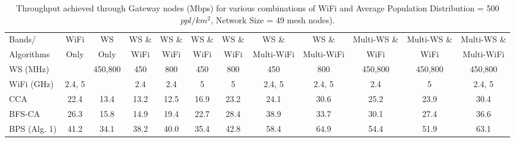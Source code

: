 \begin{table}
\centering %
\begin{tabular}{|l|c|c|c|c|c|c|c|c|c|c|c|} %
\hline %
Bands/     & WiFi    & WS      & WS \& & WS \& &  WS \& & WS \& & WS \&      &  WS \&      & Multi-WS \& & Multi-WS \& & Multi-WS \& \\%
Algorithms & Only    & Only    & WiFi  & WiFi  &  WiFi  & WiFi  & Multi-WiFi &  Multi-WiFi & WiFi        & WiFi        & Multi-WiFi  \\
\hline %
WS (MHz)   &                                                        & 450,800 & 450 &  800  &  450   & 800               & 450    & 800      & 450,800     & 450,800     & 450,800     \\
\hline
WiFi (GHz) & 2.4, 5 &                                                             & 2.4 &  2.4  &  5   & 5               & 2.4, 5& 2.4, 5        & 2.4             & 5         & 2.4, 5     \\ %
\hline
\hline %
CCA~\cite{draves2004routing}                & 22.4   &  13.4  & 13.2    &12.5    & 16.9       & 23.2   &  24.1  &   30.6&  25.2  &       23.9       &   30.4          \\      
\hline %
BFS-CA~\cite{ramachandran2006interference}  & 26.3   &  15.8  & 14.9    & 19.4   & 22.7       & 28.4   &  38.9  &   33.7&  30.1  &       27.4       &       36.6      \\      
\hline %
BPS (Alg. 1)                                & 41.2   & 34.1   &  38.2  & 40.0    & 35.4       & 42.8   & 58.4   &  64.9 &  54.4  &       51.9       &       63.1      \\      
\hline %
\end{tabular}    
\caption{Throughput achieved through Gateway nodes (Mbps) for various combinations of WiFi and Average Population Distribution = 500 $ppl/km^2$, Network Size = 49 mesh nodes).} %
\label{tab:2channelcombination}    
\vspace{-0.4in}
\end{table}    

